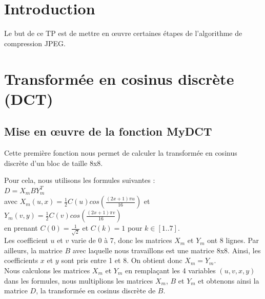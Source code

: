 \documentclass[a4paper, 12pt]{article}
\begin{document}






\clearpage

\section{Introduction}

Le but de ce TP est de mettre en œuvre certaines étapes de l’algorithme de compression JPEG.

\section{Transformée en cosinus discrète (DCT)}

\subsection{Mise en œuvre de la fonction MyDCT}\label{}

Cette première fonction nous permet de calculer la transformée en cosinus discrète d'un bloc de taille 8x8.

Pour cela, nous utilisons les formules suivantes :\\

$D = X_mBY_m^T$ \\ 

avec $X_m(u,x) = \frac{1}{2}C(u) cos(\frac{(2x + 1)\pi u }{16})$ et $Y_m(v,y) = \frac{1}{2}C(v) cos(\frac{(2x + 1)\pi v }{16})$ \\

en prenant $C(0) = \frac{1}{\sqrt{2}}$ et $C(k)=1$ pour $k \in [1..7]$. \\

Les coefficient $u$ et $v$ varie de 0 à 7, donc les matrices $X_m$ et $Y_m$ ont 8 lignes. Par ailleurs, la matrice $B$ avec laquelle nous travaillons est une matrice 8x8. Ainsi, les coefficients $x$ et $y$ sont pris entre 1 et 8. On obtient donc $X_m = Y_m$. \\

Nous calculons les matrices $X_m$ et $Y_m$ en remplaçant les 4 variables $(u, v, x, y)$ dans les formules, nous multiplions les matrices $X_m$, $B$ et $Y_m$ et obtenons ainsi la matrice $D$, la transformée en cosinus discrète de $B$.\\
\end{document}
